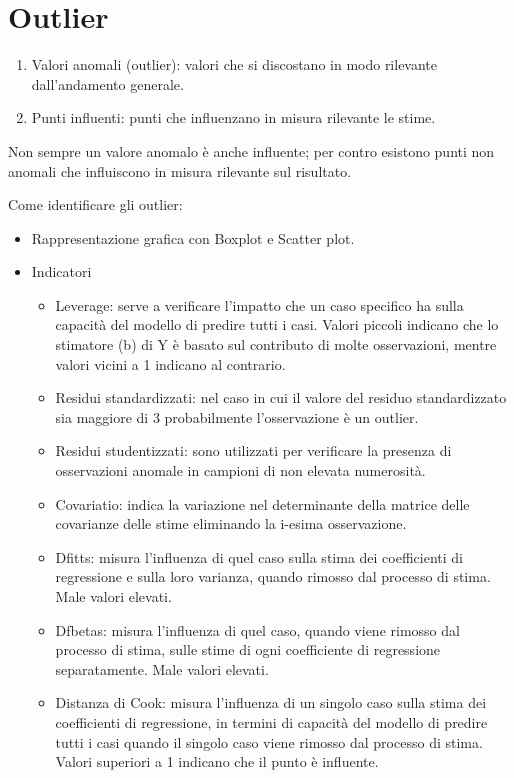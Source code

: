 \documentclass[a4page, 11pt]{article}
\begin{document}
\section{Outlier}

\begin{enumerate}[noitemsep]
\item Valori anomali (outlier): valori che si discostano in modo rilevante dall’andamento generale.
\item Punti influenti: punti che influenzano in misura rilevante le stime.
\end{enumerate}
Non sempre un valore anomalo è anche influente; per contro esistono punti non anomali che influiscono in misura rilevante sul risultato.

Come identificare gli outlier:
\begin{itemize}[noitemsep]
\item Rappresentazione grafica con Boxplot e Scatter plot.
\item Indicatori
	\begin{itemize}[noitemsep]
	\item Leverage: serve a verificare l’impatto che un caso specifico ha sulla capacità del modello di predire tutti i casi. Valori piccoli indicano che lo stimatore (b) di Y è basato sul contributo di molte osservazioni, mentre valori vicini a 1 indicano al contrario.
	\item Residui standardizzati: nel caso in cui il valore del residuo standardizzato sia maggiore di 3 probabilmente l’osservazione è un outlier.
	\item Residui studentizzati: sono utilizzati per verificare la presenza di osservazioni anomale in campioni di non elevata numerosità.
	\item Covariatio: indica la variazione nel determinante della matrice delle covarianze delle stime eliminando la i-esima osservazione.
	\item Dfitts: misura l’influenza di quel caso sulla stima dei coefficienti di regressione e sulla loro varianza, quando rimosso dal processo di stima. Male valori elevati.
	\item Dfbetas: misura l’influenza di quel caso, quando viene rimosso dal processo di stima, sulle stime di ogni coefficiente di regressione separatamente. Male valori elevati.
	\item Distanza di Cook: misura l’influenza di un singolo caso sulla stima dei coefficienti di regressione, in termini di capacità del modello di predire tutti i casi quando il singolo caso viene rimosso dal processo di stima. Valori superiori a 1 indicano che il punto è influente.
	\end{itemize}
\end{itemize}
\end{document}
